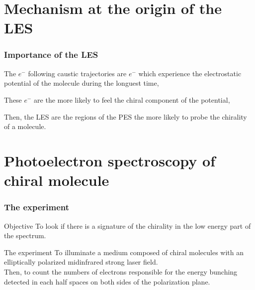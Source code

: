 \documentclass{beamer}
\begin{document}

\section{Mechanism at the origin of the LES} 

\begin{frame}
\begin{figure}[htp]
 \resizebox{1\textwidth}{!}{}
 \label{soft_recollision}
\end{figure}
\end{frame}


\begin{frame}
\frametitle{Importance of the LES}
\begin{block}{}
The $e^{-}$ following caustic trajectories are $e^{-}$ which experience the electrostatic potential of the molecule during the longuest time,
\end{block}
\begin{block}{}
These $e^{-}$ are the more likely to feel the chiral component of the potential,
\end{block}
\begin{block}{}
Then, the LES are the regions of the PES the more likely to probe the chirality of a molecule.
\end{block}
\end{frame}



\section{Photoelectron spectroscopy of chiral molecule}
\begin{frame}
\frametitle{The experiment}
\begin{block}{Objective}
To look if there is a signature of the chirality in the low energy part of the spectrum.
\end{block}
\begin{block}{The experiment}
To illuminate a medium composed of chiral molecules with an elliptically polarized midinfrared strong laser field. \\
Then, to count the numbers of electrons responsible for the energy bunching detected in each half spaces on both sides of
the polarization plane.
\end{block}
\end{frame}
\end{document}

